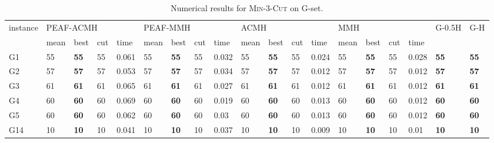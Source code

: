 \documentclass[12pt, a4paper]{article}%
\renewcommand{\arraystretch}{1.3}
\numberwithin{equation}{section}
\theoremstyle{plain}
\begin{document}
			
			{
				\scriptsize
				\setlength{\tabcolsep}{8.5pt}
				\renewcommand{\arraystretch}{1.2}
				\begin{landscape}
					\begin{longtable}{lllllllllllllllllll}
						\caption[Results for \textsc{Min}-$3$-\textsc{Cut}]{Numerical results for \textsc{Min}-$3$-\textsc{Cut} on G-set.}
						\label{tab::min3cut}\\
						\hline
						\multirow{2}{*}{instance} & \multicolumn{4}{l}{PEAF-ACMH}               & \multicolumn{4}{l}{PEAF-MMH}                & \multicolumn{4}{l}{ACMH}                   & \multicolumn{4}{l}{MMH}                    & \multirow{2}{*}{G-0.5H} & \multirow{2}{*}{G-H} \\ \cline{2-17}
						& mean    & best           & cut   & time      & mean    & best           & cut   & time     & mean    & best           & cut   & time      & mean    & best           & cut   & time     &                         &                      \\ \hline
						G1                        & 55   & \textbf{55} & 55  & 0.061 & 55   & \textbf{55} & 55  & 0.032 & 55   & \textbf{55} & 55  & 0.024 & 55   & \textbf{55} & 55  & 0.028 & \textbf{55}             & \textbf{55}          \\
						G2                        & 57   & \textbf{57} & 57  & 0.053 & 57   & \textbf{57} & 57  & 0.034 & 57   & \textbf{57} & 57  & 0.012 & 57   & \textbf{57} & 57  & 0.012 & \textbf{57}             & \textbf{57}          \\
						G3                        & 61   & \textbf{61} & 61  & 0.065 & 61   & \textbf{61} & 61  & 0.027 & 61   & \textbf{61} & 61  & 0.012 & 61   & \textbf{61} & 61  & 0.012 & \textbf{61}             & \textbf{61}          \\
						G4                        & 60   & \textbf{60} & 60  & 0.069 & 60   & \textbf{60} & 60  & 0.019 & 60   & \textbf{60} & 60  & 0.013 & 60   & \textbf{60} & 60  & 0.012 & \textbf{60}             & \textbf{60}          \\
						G5                        & 60   & \textbf{60} & 60  & 0.062 & 60   & \textbf{60} & 60  & 0.03  & 60   & \textbf{60} & 60  & 0.013 & 60   & \textbf{60} & 60  & 0.012 & \textbf{60}             & \textbf{60}          \\
						G14                       & 10   & \textbf{10} & 10  & 0.041 & 10   & \textbf{10} & 10  & 0.037 & 10   & \textbf{10} & 10  & 0.009 & 10   & \textbf{10} & 10  & 0.01  & \textbf{10}             & \textbf{10}          \\

\end{longtable}
\end{landscape}}
\end{document}
